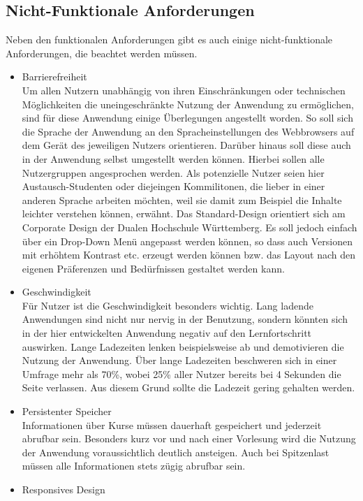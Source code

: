 \subsection{Nicht-Funktionale Anforderungen}
Neben den funktionalen Anforderungen gibt es auch einige nicht-funktionale Anforderungen, die beachtet werden müssen.
\begin{itemize}
    \item Barrierefreiheit		\\
        Um allen Nutzern unabhängig von ihren Einschränkungen oder technischen Möglichkeiten die uneingeschränkte Nutzung der Anwendung zu ermöglichen, sind für diese Anwendung einige Überlegungen angestellt worden. So soll sich die Sprache der Anwendung an den Spracheinstellungen des Webbrowsers auf dem Gerät des jeweiligen Nutzers orientieren. Darüber hinaus soll diese auch in der Anwendung selbst umgestellt werden können. Hierbei sollen alle Nutzergruppen angesprochen werden. Als potenzielle Nutzer seien hier Austausch-Studenten oder diejeingen Kommilitonen, die lieber in einer anderen Sprache arbeiten möchten, weil sie damit zum Beispiel die Inhalte leichter verstehen können, erwähnt. Das Standard-Design orientiert sich am Corporate Design der Dualen Hochschule Württemberg. Es soll jedoch einfach über ein Drop-Down Menü angepasst werden können, so dass auch Versionen mit erhöhtem Kontrast etc. erzeugt werden können bzw. das Layout nach den eigenen Präferenzen und Bedürfnissen gestaltet werden kann.
    \item Geschwindigkeit\\
        Für Nutzer ist die Geschwindigkeit besonders wichtig.
        Lang ladende Anwendungen sind nicht nur nervig in der Benutzung, sondern könnten sich in der hier entwickelten Anwendung negativ auf den Lernfortschritt auswirken. Lange Ladezeiten lenken beispielsweise ab und demotivieren die Nutzung der Anwendung.
        Über lange Ladezeiten beschweren sich in einer Umfrage mehr als 70\%, wobei 25\% aller Nutzer bereits bei 4 Sekunden die Seite verlassen.\autocite{loadingTimes}
        Aus diesem Grund sollte die Ladezeit gering gehalten werden.
    \item Persistenter Speicher             \\
        Informationen über Kurse müssen dauerhaft gespeichert und jederzeit abrufbar sein.
        Besonders kurz vor und nach einer Vorlesung wird die Nutzung der Anwendung voraussichtlich deutlich ansteigen.
        Auch bei Spitzenlast müssen alle Informationen stets zügig abrufbar sein.
    \item Responsives Design\\

\end{itemize}
